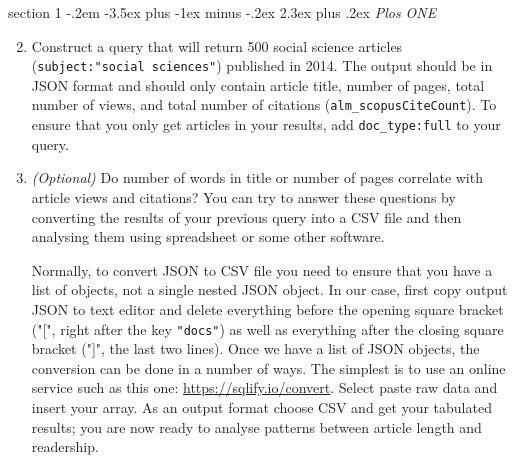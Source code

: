 \documentclass[12pt]{article}
\makeatletter
\newenvironment{problem}{\@startsection
	{section}
	{1}
	{-.2em}
	{-3.5ex plus -1ex minus -.2ex}
	{2.3ex plus .2ex}
	{\pagebreak[3]%
		\large\bf\noindent{Exercise }
	}
}
{\vspace{0.8cm}}
\makeatother
\begin{document}
\begin{problem}{\it Plos ONE}
	\begin{enumerate}[label=\textbf{\alph*)},leftmargin=*]
		\setcounter{enumi}{1}
		\item Construct a query that will return 500 social science articles (\texttt{subject:"social sciences"}) published in 2014. The output should be in JSON format and should only contain article title, number of pages, total number of views, and total number of citations (\texttt{alm\_scopusCiteCount}). To ensure that you only get articles in your results, add \texttt{doc\_type:full} to your query.
		
		\item \emph{(Optional)} Do number of words in title or number of pages correlate with article views and citations? You can try to answer these questions by converting the results of your previous query into a CSV file and then analysing them using spreadsheet or some other software. 
		
		Normally, to convert JSON to CSV file you need to ensure that you have a list of objects, not a single nested JSON object. In our case, first copy output JSON to text editor and delete everything before the opening square bracket ("[", right after the key \texttt{"docs"}) as well as everything after the closing square bracket ("]", the last two lines). Once we have a list of JSON objects, the conversion can be done in a number of ways. The simplest is to use an online service such as this one: \url{https://sqlify.io/convert}. Select paste raw data and insert your array. As an output format choose CSV and get your tabulated results; you are now ready to analyse patterns between article length and readership.
		
	\end{enumerate}
	
\end{problem}
\end{document}
